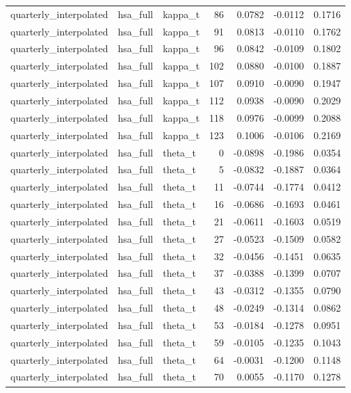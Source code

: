 \begin{tabular}{lllrrrr}
quarterly\_interpolated & hsa\_full & kappa\_t & 86 & 0.0782 & -0.0112 & 0.1716 \\
quarterly\_interpolated & hsa\_full & kappa\_t & 91 & 0.0813 & -0.0110 & 0.1762 \\
quarterly\_interpolated & hsa\_full & kappa\_t & 96 & 0.0842 & -0.0109 & 0.1802 \\
quarterly\_interpolated & hsa\_full & kappa\_t & 102 & 0.0880 & -0.0100 & 0.1887 \\
quarterly\_interpolated & hsa\_full & kappa\_t & 107 & 0.0910 & -0.0090 & 0.1947 \\
quarterly\_interpolated & hsa\_full & kappa\_t & 112 & 0.0938 & -0.0090 & 0.2029 \\
quarterly\_interpolated & hsa\_full & kappa\_t & 118 & 0.0976 & -0.0099 & 0.2088 \\
quarterly\_interpolated & hsa\_full & kappa\_t & 123 & 0.1006 & -0.0106 & 0.2169 \\
quarterly\_interpolated & hsa\_full & theta\_t & 0 & -0.0898 & -0.1986 & 0.0354 \\
quarterly\_interpolated & hsa\_full & theta\_t & 5 & -0.0832 & -0.1887 & 0.0364 \\
quarterly\_interpolated & hsa\_full & theta\_t & 11 & -0.0744 & -0.1774 & 0.0412 \\
quarterly\_interpolated & hsa\_full & theta\_t & 16 & -0.0686 & -0.1693 & 0.0461 \\
quarterly\_interpolated & hsa\_full & theta\_t & 21 & -0.0611 & -0.1603 & 0.0519 \\
quarterly\_interpolated & hsa\_full & theta\_t & 27 & -0.0523 & -0.1509 & 0.0582 \\
quarterly\_interpolated & hsa\_full & theta\_t & 32 & -0.0456 & -0.1451 & 0.0635 \\
quarterly\_interpolated & hsa\_full & theta\_t & 37 & -0.0388 & -0.1399 & 0.0707 \\
quarterly\_interpolated & hsa\_full & theta\_t & 43 & -0.0312 & -0.1355 & 0.0790 \\
quarterly\_interpolated & hsa\_full & theta\_t & 48 & -0.0249 & -0.1314 & 0.0862 \\
quarterly\_interpolated & hsa\_full & theta\_t & 53 & -0.0184 & -0.1278 & 0.0951 \\
quarterly\_interpolated & hsa\_full & theta\_t & 59 & -0.0105 & -0.1235 & 0.1043 \\
quarterly\_interpolated & hsa\_full & theta\_t & 64 & -0.0031 & -0.1200 & 0.1148 \\
quarterly\_interpolated & hsa\_full & theta\_t & 70 & 0.0055 & -0.1170 & 0.1278 \\

\end{tabular}
